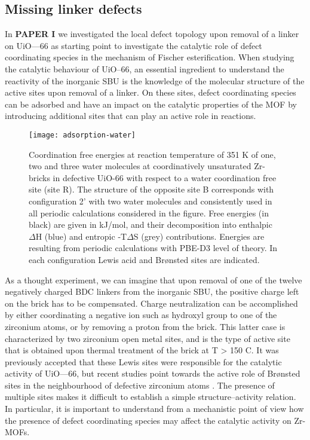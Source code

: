 \subsection{Missing linker defects}
In \textbf{PAPER I} we investigated the local defect topology upon removal of a linker on UiO—66 as starting point to investigate the catalytic role of defect coordinating species in the mechanism of Fischer esterification. When studying the catalytic behaviour of UiO--66, an essential ingredient to understand the reactivity of the inorganic SBU is the knowledge of the molecular structure of the active sites upon removal of a linker. On these sites, defect coordinating species can be adsorbed and have an impact on the catalytic properties of the MOF by introducing additional sites that can play an active role in reactions. 
\begin{figure}[!htp]
	\centering
	\texttt{[image: adsorption-water]}
	\caption{Coordination free energies at reaction temperature of 351 K of one, two and three water molecules at coordinatively unsaturated Zr-bricks in defective UiO-66 with respect to a water coordination free site (site R). The structure of the opposite site B corresponds with configuration 2’ with two water molecules and consistently used in all periodic calculations considered in the figure. Free energies (in black) are given in kJ/mol, and their decomposition into enthalpic $\Delta$H (blue) and entropic -T$\Delta$S (grey) contributions. Energies are resulting from periodic calculations with PBE-D3 level of theory. In each configuration Lewis acid and Brønsted sites are indicated.}
	\label{fig:adsorption-water}
\end{figure}
As a thought experiment, we can imagine that upon removal of one of the twelve negatively charged BDC linkers from the inorganic  SBU, the positive charge left on the brick has to be compensated. Charge neutralization can be accomplished by either coordinating a negative ion such as hydroxyl group to one of the zirconium atoms, or by removing a proton from the brick. This latter case is characterized by two zirconium open metal sites, and is the type of active site that is obtained upon thermal treatment of the brick at T > 150 C.  It was previously accepted that these Lewis sites were responsible for the catalytic activity of UiO—66, but recent studies point towards the active role of Br\o{}nsted sites in the neighbourhood of defective zirconium atoms \cite{canivet2014water, oien2014detailed, canivet2016origin, ling2016dynamic, liu2016probing, klet2016evaluation, vandichel2016water, ghosh2014water}. The presence of multiple sites makes it difficult to establish a simple structure--activity relation. In particular, it is important to understand from a mechanistic point of view how the presence of defect coordinating species may affect the catalytic activity on Zr-MOFs. 
